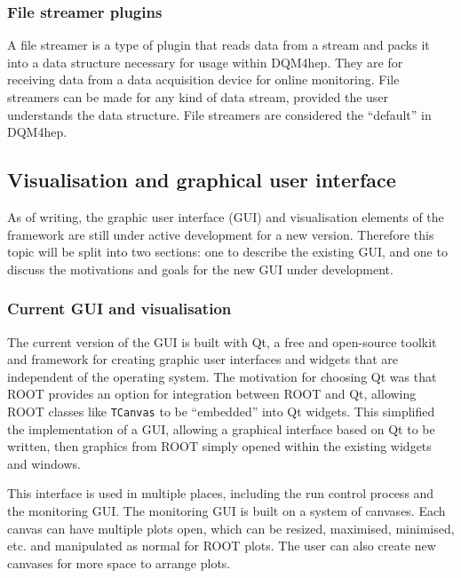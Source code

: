 \subsubsection{File streamer plugins}
A file streamer is a type of plugin that reads data from a stream and packs it into a data structure necessary for usage within \acrshort{DQM4hep}. They are for receiving data from a data acquisition device for online monitoring. File streamers can be made for any kind of data stream, provided the user understands the data structure. File streamers are considered the ``default'' in \acrshort{DQM4hep}.

\subsection{Visualisation and graphical user interface}
As of writing, the graphic user interface (\acrshort{GUI}) and visualisation elements of the framework are still under active development for a new version. Therefore this topic will be split into two sections: one to describe the existing \acrshort{GUI}, and one to discuss the motivations and goals for the new \acrshort{GUI} under development. 

\subsubsection{Current GUI and visualisation} 
The current version of the \acrshort{GUI} is built with Qt, a free and open-source toolkit and framework for creating graphic user interfaces and widgets that are independent of the operating system. The motivation for choosing Qt was that ROOT provides an option for integration between ROOT and Qt, allowing ROOT classes like \texttt{TCanvas} to be ``embedded'' into Qt widgets. This simplified the implementation of a \acrshort{GUI}, allowing a graphical interface based on Qt to be written, then graphics from ROOT simply opened within the existing widgets and windows. %

This interface is used in multiple places, including the run control process and the monitoring \acrshort{GUI}. The monitoring \acrshort{GUI} is built on a system of canvases. Each canvas can have multiple plots open, which can be resized, maximised, minimised, etc. and manipulated as normal for ROOT plots. The user can also create new canvases for more space to arrange plots.

